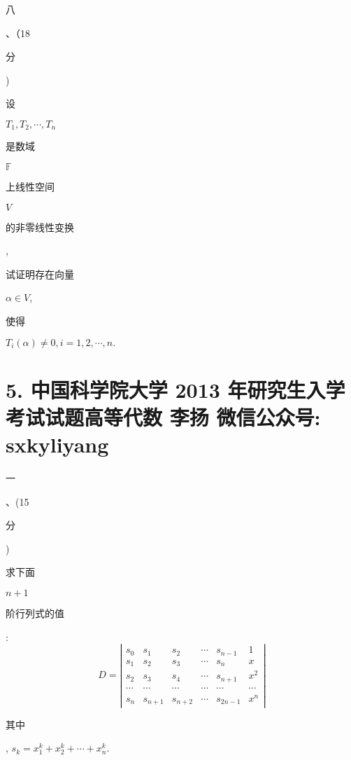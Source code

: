 \documentclass[10pt]{article}
\begin{document}
\begin{CJK}{UTF8}{mj}八\end{CJK}、（18 \begin{CJK}{UTF8}{mj}分\end{CJK}) \begin{CJK}{UTF8}{mj}设\end{CJK} $T_{1}, T_{2}, \cdots, T_{n}$ \begin{CJK}{UTF8}{mj}是数域\end{CJK} $\mathbb{F}$ \begin{CJK}{UTF8}{mj}上线性空间\end{CJK} $V$ \begin{CJK}{UTF8}{mj}的非零线性变换\end{CJK}, \begin{CJK}{UTF8}{mj}试证明存在向量\end{CJK} $\alpha \in V$, \begin{CJK}{UTF8}{mj}使得\end{CJK} $T_{i}(\alpha) \neq 0, i=1,2, \cdots, n .$

\section{5. 中国科学院大学 2013 年研究生入学考试试题高等代数 
 李扬 
 微信公众号: sxkyliyang}
\begin{CJK}{UTF8}{mj}一\end{CJK}、(15 \begin{CJK}{UTF8}{mj}分\end{CJK}) \begin{CJK}{UTF8}{mj}求下面\end{CJK} $n+1$ \begin{CJK}{UTF8}{mj}阶行列式的值\end{CJK}:
$$
D=\left|\begin{array}{cccccc}
s_{0} & s_{1} & s_{2} & \cdots & s_{n-1} & 1 \\
s_{1} & s_{2} & s_{3} & \cdots & s_{n} & x \\
s_{2} & s_{3} & s_{4} & \cdots & s_{n+1} & x^{2} \\
\cdots & \cdots & \cdots & \cdots & \cdots & \cdots \\
s_{n} & s_{n+1} & s_{n+2} & \cdots & s_{2 n-1} & x^{n}
\end{array}\right|
$$
\begin{CJK}{UTF8}{mj}其中\end{CJK}, $s_{k}=x_{1}^{k}+x_{2}^{k}+\cdots+x_{n}^{k}$.
\end{document}
